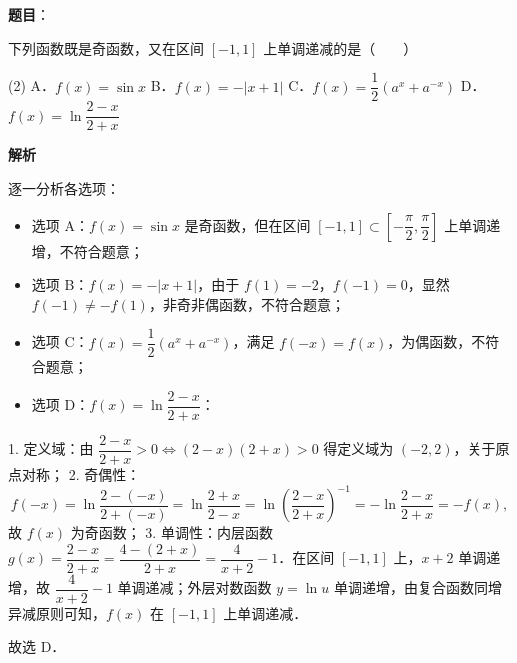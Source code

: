 \begin{answer}

\textbf{题目}：

下列函数既是奇函数，又在区间 $[-1, 1]$ 上单调递减的是\mbox{（　　）}

\begin{gkopts}(2)
\task A．$f(x) = \sin x$
\task B．$f(x) = -|x + 1|$
\task C．$f(x) = \dfrac{1}{2}(a^x + a^{-x})$
\task D．$f(x) = \ln \dfrac{2-x}{2+x}$
\end{gkopts}

\textbf{解析}

逐一分析各选项：
\begin{itemize}
\item 选项 A：$f(x) = \sin x$ 是奇函数，但在区间 $[-1, 1] \subset \left[-\dfrac{\pi}{2}, \dfrac{\pi}{2}\right]$ 上单调递增，不符合题意；
\item 选项 B：$f(x) = -|x + 1|$，由于 $f(1) = -2$，$f(-1) = 0$，显然 $f(-1) \neq -f(1)$，非奇非偶函数，不符合题意；
\item 选项 C：$f(x) = \dfrac{1}{2}(a^x + a^{-x})$，满足 $f(-x) = f(x)$，为偶函数，不符合题意；
\item 选项 D：$f(x) = \ln \dfrac{2-x}{2+x}$：
\end{itemize}
  1. 定义域：由 $\dfrac{2-x}{2+x} > 0 \iff (2-x)(2+x) > 0$ 得定义域为 $(-2, 2)$，关于原点对称；
  2. 奇偶性：
\nopagebreak[4]
\[
f(-x) = \ln \dfrac{2 - (-x)}{2 + (-x)} = \ln \dfrac{2+x}{2-x} = \ln \left(\dfrac{2-x}{2+x}\right)^{-1} = -\ln \dfrac{2-x}{2+x} = -f(x),
\]
  故 $f(x)$ 为奇函数；
  3. 单调性：内层函数 $g(x) = \dfrac{2-x}{2+x} = \dfrac{4-(2+x)}{2+x} = \dfrac{4}{x+2} - 1$．在区间 $[-1, 1]$ 上，$x+2$ 单调递增，故 $\dfrac{4}{x+2}-1$ 单调递减；外层对数函数 $y = \ln u$ 单调递增，由复合函数同增异减原则可知，$f(x)$ 在 $[-1, 1]$ 上单调递减．

故选 D．


\end{answer}
